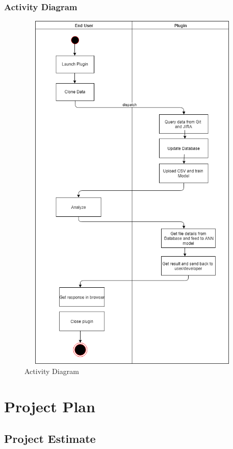 \documentclass[oneside,a4paper,12pt]{book}
\begin{document}
\subsection{Activity Diagram}
\begin{figure}[h]
\begin{Center}
    \includegraphics[width=4.4in,height=7in]{Activity.png}
    \caption{Activity Diagram}
    \label{fig:Activity Diagram}
    \end{Center}
\end{figure}
\newpage

\chapter{Project Plan}

\section{Project Estimate}
\end{document}
